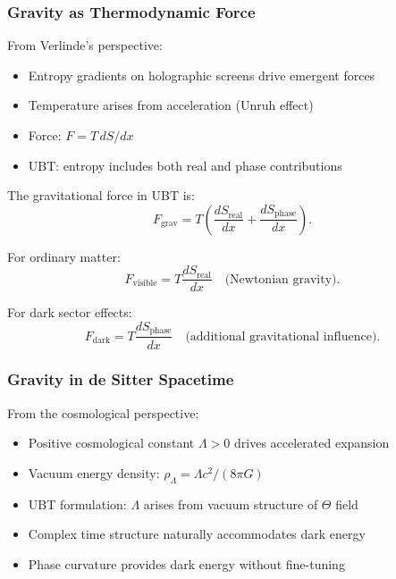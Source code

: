 \subsubsection{Gravity as Thermodynamic Force}

From Verlinde's perspective:
\begin{itemize}
\item Entropy gradients on holographic screens drive emergent forces
\item Temperature arises from acceleration (Unruh effect)
\item Force: $F = T \, dS/dx$
\item UBT: entropy includes both real and phase contributions
\end{itemize}

The gravitational force in UBT is:
\begin{equation}
F_{\text{grav}} = T\left(\frac{dS_{\text{real}}}{dx} + \frac{dS_{\text{phase}}}{dx}\right).
\end{equation}

For ordinary matter:
\begin{equation}
F_{\text{visible}} = T\frac{dS_{\text{real}}}{dx} \quad \text{(Newtonian gravity)}.
\end{equation}

For dark sector effects:
\begin{equation}
F_{\text{dark}} = T\frac{dS_{\text{phase}}}{dx} \quad \text{(additional gravitational influence)}.
\end{equation}

\subsubsection{Gravity in de Sitter Spacetime}

From the cosmological perspective:
\begin{itemize}
\item Positive cosmological constant $\Lambda > 0$ drives accelerated expansion
\item Vacuum energy density: $\rho_{\Lambda} = \Lambda c^2 / (8\pi G)$
\item UBT formulation: $\Lambda$ arises from vacuum structure of $\Theta$ field
\item Complex time structure naturally accommodates dark energy
\item Phase curvature provides dark energy without fine-tuning
\end{itemize}

